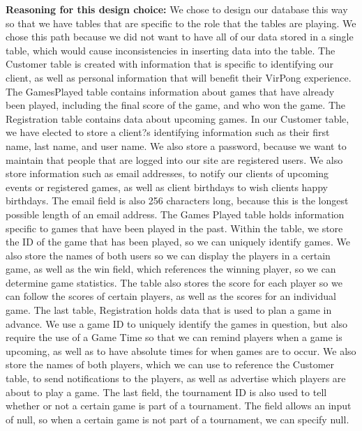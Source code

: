 \textbf{Reasoning for this design choice:}
    We chose to design our database this way so that we have tables that are specific to the role that the tables are playing. We chose this path because we did not want to have all of our data stored in a single table, which would cause inconsistencies in inserting data into the table. The Customer table is created with information that is specific to identifying our client, as well as personal information that will benefit their VirPong experience. The GamesPlayed table contains information about games that have already been played, including the final score of the game, and who won the game. The Registration table contains data about upcoming games.
    In our Customer table, we have elected to store a client?s identifying information such as their first name, last name, and user name. We also store a password, because we want to maintain that people that are logged into our site are registered users. We also store information such as email addresses, to notify our clients of upcoming events or registered games, as well as client birthdays to wish clients happy birthdays. The email field is also 256 characters long, because this is the longest possible length of an email address.
    The Games Played table holds information specific to games that have been played in the past. Within the table, we store the ID of the game that has been played, so we can uniquely identify games. We also store the names of both users so we can display the players in a certain game, as well as the win field, which references the winning player, so we can determine game statistics. The table also stores the score for each player so we can follow the scores of certain players, as well as the scores for an individual game.
    The last table, Registration holds data that is used to plan a game in advance. We use a game ID to uniquely identify the games in question, but also require the use of a Game Time so that we can remind players when a game is upcoming, as well as to have absolute times for when games are to occur. We also store the names of both players, which we can use to reference the Customer table, to send notifications to the players, as well as advertise which players are about to play a game. The last field, the tournament ID is also used to tell whether or not a certain game is part of a tournament. The field allows an input of null, so when a certain game is not part of a tournament, we can specify null.
